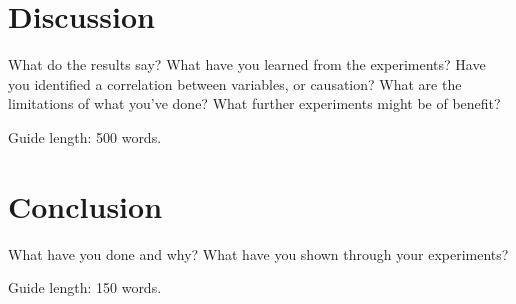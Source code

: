 \documentclass{csfourzero}
\begin{document}
\section{Discussion}
\label{sec:discuss}

What do the results say? What have you learned from the
experiments? Have you identified a correlation between variables, or
causation? What are the limitations of what you've done? What further
experiments might be of benefit?

Guide length: 500 words.

\section{Conclusion}
\label{sec:conc}

What have you done and why? What have you shown through your
experiments?

Guide length: 150 words.


\end{document}
